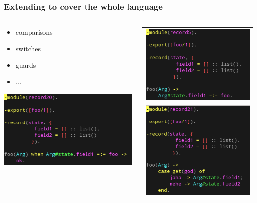\begin{frame}
\frametitle{Extending to cover the whole language}

\begin{columns}
\begin{column}[l]{3.5cm}

	\begin{block}{}
		\begin{itemize}
			\item \scriptsize{comparisons}
			\item \scriptsize{switches}
			\item \scriptsize{guards}
			\item \scriptsize{...}
		\end{itemize}
	\end{block}

	\includegraphics[scale=0.4]{../figures/test20}

\end{column}

\begin{column}[r]{4.5cm}
\begin{tabular}{ c }
  	\includegraphics[scale=0.4]{../figures/test5}
\\
	\includegraphics[scale=0.4]{../figures/test21}
\end{tabular}
\end{column}
\end{columns}

\end{frame}

